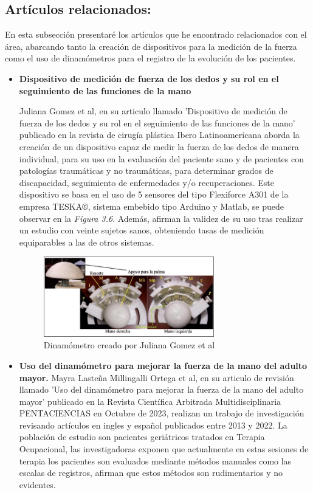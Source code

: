 \subsection{Artículos relacionados:}
En esta subsección presentaré los artículos que he encontrado relacionados con el área, abarcando tanto la creación de dispositivos para la medición de la fuerza como el uso de dinamómetros para el registro de la evolución de los pacientes.
\begin{itemize}
    \item \textbf{Dispositivo de medición de fuerza de los dedos y su
rol en el seguimiento de las funciones de la mano}

Juliana Gomez et al, en su articulo llamado 'Dispositivo de medición de fuerza de los dedos y su rol en el seguimiento de las funciones de la mano' publicado en la revista de cirugía plástica Ibero Latinoamericana aborda la creación de un dispositivo capaz de medir la fuerza de los dedos de manera individual, para su uso en la evaluación del paciente sano y de pacientes con patologías traumáticas y no traumáticas, para determinar grados de discapacidad, seguimiento de enfermedades y/o recuperaciones. 
Este dispositivo se basa en el uso de 5 sensores del tipo Flexiforce A301 de la empresa TESKA®, sistema embebido
tipo Arduino y Matlab, se puede observar en la \textit{Figura 3.6}. Además, afirman la validez de su uso tras realizar un estudio con veinte sujetos sanos, obteniendo tasas de medición equiparables a las de otros sistemas.
    \begin{figure}[h]
        \centering
        \includegraphics[width=0.7\textwidth]{img/dispositivo Revista.jpg}
        \caption{Dinamómetro creado por Juliana Gomez et al}
        \label{fig:activforce}
    \end{figure}
    \item \textbf{Uso del dinamómetro para mejorar la fuerza de la mano del adulto mayor.}
    Mayra Lasteña Millingalli Ortega et al, en su articulo de revisión llamado 'Uso del dinamómetro para mejorar la fuerza de la mano del adulto mayor' publicado en la Revista Científica Arbitrada Multidisciplinaria PENTACIENCIAS en Octubre de 2023, realizan un trabajo de investigación revisando artículos en ingles y español publicados entre 2013 y 2022.
    La población de estudio son pacientes geriátricos tratados en Terapia Ocupacional, las investigadoras exponen que actualmente en estas sesiones de terapia los pacientes son evaluados mediante métodos manuales como las escalas de registros, afirman que estos métodos son rudimentarios y no evidentes. 
\end{itemize} 
